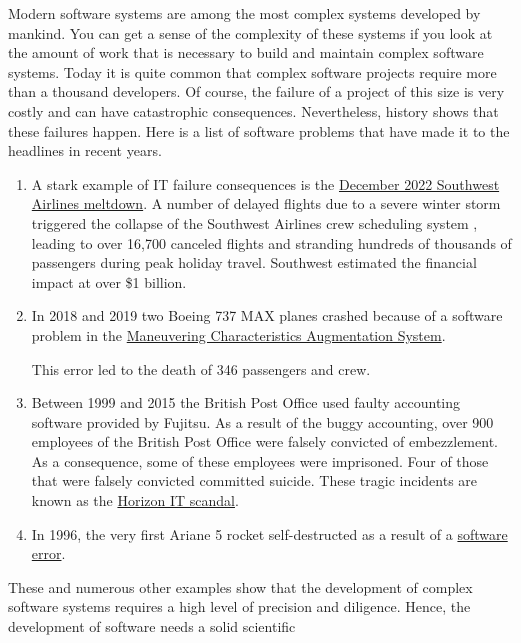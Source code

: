 Modern software systems are among the most complex systems developed by mankind.  You can get a
sense of the complexity of these systems if you look at the amount of work that is necessary to
build and maintain complex software systems.  Today it is quite common that complex software projects require
more than a thousand developers.  Of course, the failure of a project of this size is very costly and can have
catastrophic consequences.  Nevertheless, history shows that these failures happen.
Here is a list of software problems that have made it to the headlines in recent years.
\begin{enumerate}
\item A stark example of IT failure consequences is the
      \href{https://www.npr.org/2023/01/26/1151667801/southwest-airlines-investigation-losses-holiday-travel-cancellations}{December 2022 Southwest Airlines meltdown}.
      A number of delayed flights due to a severe winter storm triggered the collapse of the Southwest Airlines
      crew scheduling system , leading to over 16,700 
      canceled flights and stranding hundreds of thousands of passengers during peak holiday travel. Southwest
      estimated the financial impact at over \$1 billion. 
\item In 2018 and 2019 two Boeing 737 MAX planes crashed because of a software problem in the
      \href{https://en.wikipedia.org/wiki/Maneuvering_Characteristics_Augmentation_System}{Maneuvering
        Characteristics Augmentation System}.
      
      This error led to the death of 346 passengers and crew.
\item Between 1999 and 2015 the British Post Office used faulty accounting software provided by Fujitsu.
      As a result of the buggy accounting, over 900 employees of the British Post Office were falsely
      convicted of embezzlement.  As a consequence, some of these employees were imprisoned.  Four of those
      that were falsely convicted committed suicide.  These tragic incidents are known as the
      \href{https://en.wikipedia.org/wiki/British_Post_Office_scandal}{Horizon IT scandal}.     
\item In 1996, the very first Ariane 5 rocket self-destructed as a result of a
      \href{https://www.bugsnag.com/blog/bug-day-ariane-5-disaster/}{software error}. 
\end{enumerate}
These and numerous other examples show that the development of complex software systems requires a high level
of precision and diligence.  Hence, the development of software needs a solid scientific
